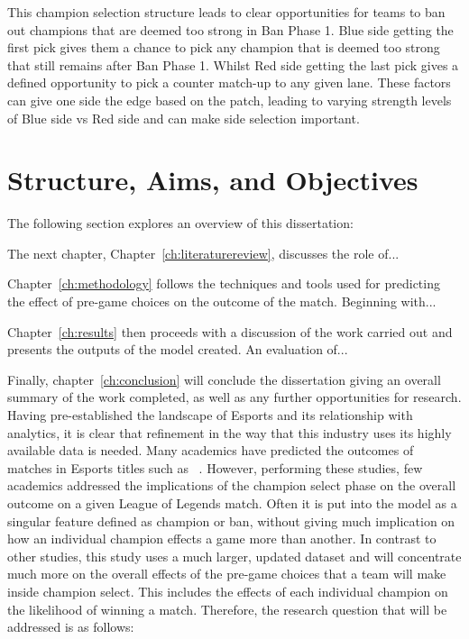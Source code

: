 This champion selection structure leads to clear opportunities for teams to ban out champions that are deemed too strong in Ban Phase 1.
Blue side getting the first pick gives them a chance to pick any champion that is deemed too strong that still remains after Ban Phase 1.
Whilst Red side getting the last pick gives a defined opportunity to pick a counter match-up to any given lane.
These factors can give one side the edge based on the \Gls{patch}, leading to varying strength levels of Blue side vs Red side and can make side selection important.

\section{Structure, Aims, and Objectives}\label{sec:Structure, Aims, and Objectives}

The following section explores an overview of this dissertation:

The next chapter, Chapter~\ref{ch:literaturereview}, discusses the role of...

Chapter~\ref{ch:methodology} follows the techniques and tools used for predicting the effect of pre-game choices on the outcome of the match.
Beginning with...


Chapter~\ref{ch:results} then proceeds with a discussion of the work
carried out and presents the outputs of the model created.
An evaluation of...

Finally, chapter~\ref{ch:conclusion} will conclude the dissertation giving an overall summary of the work completed, as well as any further opportunities for research. \\


Having pre-established the landscape of Esports and its relationship with analytics, it is clear that refinement in the way that this industry uses its highly available data is needed.
Many academics have predicted the outcomes of matches in Esports titles such as ~\citet{silva2018continuous}.
However, performing these studies, few academics addressed the implications of the champion select phase on the overall outcome on a given League of Legends match.
Often it is put into the model as a singular feature defined as champion or ban, without giving much implication on how an individual champion effects a game more than another.
In contrast to other studies, this study uses a much larger, updated dataset and will concentrate much more on the overall effects of the pre-game choices that a team will make inside champion select.
This includes the effects of each individual champion on the likelihood of winning a match.
Therefore, the research question that will be addressed is as follows:

